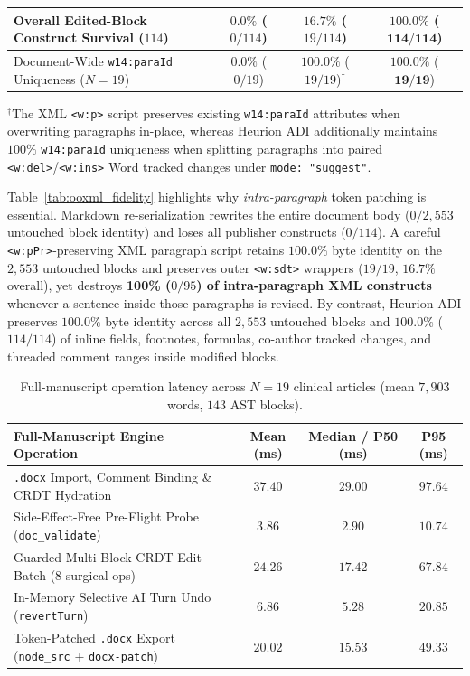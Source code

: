 \documentclass[11pt,a4paper]{article}
\begin{document}
\begin{table}[!t]
{\begin{tabular}{@{}lccc@{}}
\textbf{Overall Edited-Block Construct Survival ($114$)} & $0.0\%$ ($0/114$) & $16.7\%$ ($19/114$) & $\mathbf{100.0\%}$ ($\mathbf{114/114}$) \\
\midrule
Document-Wide \texttt{w14:paraId} Uniqueness ($N=19$) & $0.0\%$ ($0/19$) & $\mathbf{100.0\%}$ ($19/19$)$^\dagger$ & $\mathbf{100.0\%}$ ($\mathbf{19/19}$) \\
\bottomrule
\end{tabular}
}
\vspace{2pt}
\raggedright\footnotesize $^\dagger$The XML \texttt{<w:p>} script preserves existing \texttt{w14:paraId} attributes when overwriting paragraphs in-place, whereas Heurion ADI additionally maintains $100\%$ \texttt{w14:paraId} uniqueness when splitting paragraphs into paired \texttt{<w:del>}/\texttt{<w:ins>} Word tracked changes under \texttt{mode: "suggest"}.
\end{table}

Table~\ref{tab:ooxml_fidelity} highlights why \emph{intra-paragraph} token patching is essential. Markdown re-serialization rewrites the entire document body ($0/2{,}553$ untouched block identity) and loses all publisher constructs ($0/114$). A careful \texttt{<w:pPr>}-preserving XML paragraph script retains $100.0\%$ byte identity on the $2{,}553$ untouched blocks and preserves outer \texttt{<w:sdt>} wrappers ($19/19$, $16.7\%$ overall), yet destroys \textbf{100\% ($0/95$) of intra-paragraph XML constructs} whenever a sentence inside those paragraphs is revised. By contrast, Heurion ADI preserves $100.0\%$ byte identity across all $2{,}553$ untouched blocks and $100.0\%$ ($114/114$) of inline fields, footnotes, formulas, co-author tracked changes, and threaded comment ranges inside modified blocks.

\begin{table}[!t]
\centering
\caption{Full-manuscript operation latency across $N=19$ clinical articles (mean $7{,}903$ words, $143$ AST blocks).}
\label{tab:latency_profile}
\vspace{2pt}
\small
\setlength{\tabcolsep}{0pt}
\begin{tabular*}{\textwidth}{@{\extracolsep{\fill}}lccc@{}}
\toprule
\textbf{Full-Manuscript Engine Operation} & \textbf{Mean (ms)} & \textbf{Median / P50 (ms)} & \textbf{P95 (ms)} \\
\midrule
\texttt{.docx} Import, Comment Binding \& CRDT Hydration & $37.40$ & $29.00$ & $97.64$ \\
Side-Effect-Free Pre-Flight Probe (\texttt{doc\_validate}) & $\mathbf{3.86}$ & $\mathbf{2.90}$ & $\mathbf{10.74}$ \\
Guarded Multi-Block CRDT Edit Batch ($8$ surgical ops) & $24.26$ & $17.42$ & $67.84$ \\
In-Memory Selective AI Turn Undo (\texttt{revertTurn}) & $\mathbf{6.86}$ & $\mathbf{5.28}$ & $\mathbf{20.85}$ \\
Token-Patched \texttt{.docx} Export (\texttt{node\_src} + \texttt{docx-patch}) & $20.02$ & $15.53$ & $49.33$ \\
\bottomrule
\end{tabular*}
\end{table}
\end{document}
